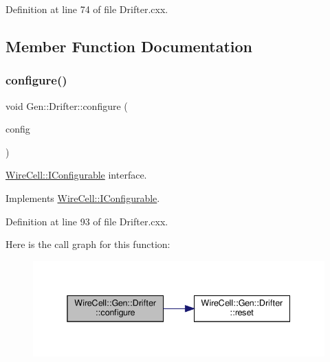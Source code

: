 Definition at line 74 of file Drifter.\+cxx.



\subsection{Member Function Documentation}
\mbox{\label{class_wire_cell_1_1_gen_1_1_drifter_a3a4689030cd1223426682fefc0e85b35}} 
\subsubsection{\texorpdfstring{configure()}{configure()}}
{\footnotesize\ttfamily void Gen\+::\+Drifter\+::configure (\begin{DoxyParamCaption}\item[{const \hyperlink{namespace_wire_cell_a9f705541fc1d46c608b3d32c182333ee}{Wire\+Cell\+::\+Configuration} \&}]{config }\end{DoxyParamCaption})\hspace{0.3cm}{\ttfamily [virtual]}}



\hyperlink{class_wire_cell_1_1_i_configurable}{Wire\+Cell\+::\+I\+Configurable} interface. 



Implements \hyperlink{class_wire_cell_1_1_i_configurable_a57ff687923a724093df3de59c6ff237d}{Wire\+Cell\+::\+I\+Configurable}.



Definition at line 93 of file Drifter.\+cxx.

Here is the call graph for this function\+:
\nopagebreak
\begin{figure}[H]
\begin{center}
\leavevmode
\includegraphics[width=338pt]{class_wire_cell_1_1_gen_1_1_drifter_a3a4689030cd1223426682fefc0e85b35_cgraph}
\end{center}
\end{figure}
\mbox{\label{class_wire_cell_1_1_gen_1_1_drifter_ac0a59fbb4c7da9c2f7711dc8a0b4ae48}} 
